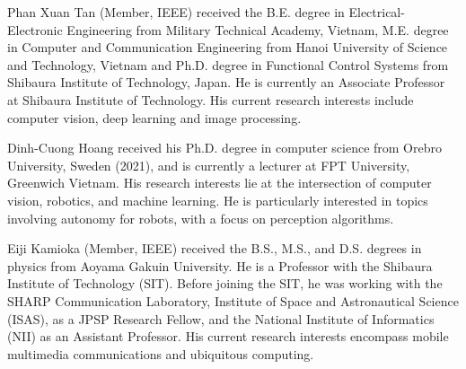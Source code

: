 \documentclass{ieeeaccess}
\begin{document}
\begin{IEEEbiography}{Phan Xuan Tan} (Member, IEEE) received the B.E. degree in Electrical-Electronic Engineering from Military Technical Academy, Vietnam, M.E. degree in Computer and Communication Engineering from Hanoi University of Science and Technology, Vietnam and Ph.D. degree in Functional Control Systems from Shibaura Institute of Technology, Japan. He is currently an Associate Professor at Shibaura Institute of Technology. His current research interests include computer vision, deep learning and image processing.
\end{IEEEbiography}

\begin{IEEEbiography}{Dinh-Cuong Hoang} received his Ph.D. degree in computer science from Orebro University, Sweden (2021), and is currently a lecturer at FPT University, Greenwich Vietnam. His research interests lie at the intersection of computer vision, robotics, and machine learning. He is particularly interested in topics involving autonomy for robots, with a focus on perception algorithms.
\end{IEEEbiography}

\begin{IEEEbiography}{Eiji Kamioka} (Member, IEEE) received the B.S., M.S., and D.S. degrees in physics from Aoyama Gakuin University. He is a Professor with the Shibaura Institute of Technology (SIT). Before joining the SIT, he was working with the SHARP Communication Laboratory, Institute of Space and Astronautical Science (ISAS), as a JPSP Research Fellow, and the National Institute of Informatics (NII) as an Assistant Professor. His current research interests encompass mobile multimedia communications and ubiquitous computing.
\end{IEEEbiography}
\end{document}
